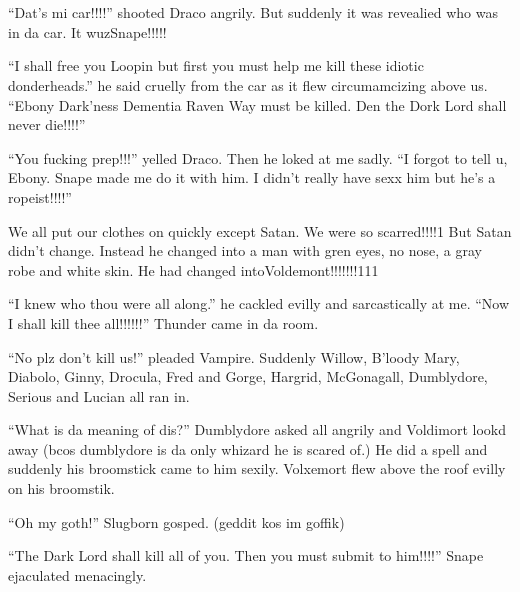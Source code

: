 \section{}



\enquote{Dat's mi car!!!!} shooted Draco angrily. But suddenly it was revealied who was in da car. It wuz\dotfill Snape!!!!!

\enquote{I shall free you Loopin but first you must help me kill these idiotic donderheads.} he said cruelly from the car as it flew circumamcizing above us. \enquote{Ebony Dark'ness Dementia Raven Way must be killed. Den the Dork Lord shall never die!!!!}

\enquote{You fucking prep!!!} yelled Draco. Then he loked at me sadly. \enquote{I forgot to tell u, Ebony. Snape made me do it with him. I didn't really have sexx him but he's a ropeist!!!!}

We all put our clothes on quickly except Satan. We were so scarred!!!!1 But Satan didn't change. Instead he changed into a man with gren eyes, no nose, a gray robe and white skin. He had changed into\dotfill Voldemont!!!!!!!111

\enquote{I knew who thou were all along.} he cackled evilly and sarcastically at me. \enquote{Now I shall kill thee all!!!!!!} Thunder came in da room.

\enquote{No plz don't kill us!} pleaded Vampire. Suddenly Willow, B'loody Mary, Diabolo, Ginny, Drocula, Fred and Gorge, Hargrid, McGonagall, Dumblydore, Serious and Lucian all ran in.

\enquote{What is da meaning of dis?} Dumblydore asked all angrily and Voldimort lookd away (bcos dumblydore is da only whizard he is scared of.) He did a spell and suddenly his broomstick came to him sexily. Volxemort flew above the roof evilly on his broomstik.

\enquote{Oh my goth!} Slugborn gosped. (geddit kos im goffik)

\enquote{The Dark Lord shall kill all of you. Then you must submit to him!!!!} Snape ejaculated menacingly.

